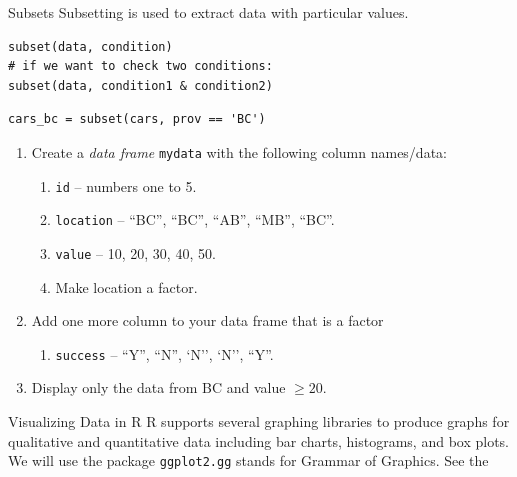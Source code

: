 \documentclass[xcolor=svgnames, 10pt, handout]{beamer}
\begin{document}
\begin{frame}[fragile]{Subsets}
Subsetting is used to extract data with particular values.
\vfill
\begin{Verbatim}[xleftmargin=2em, xrightmargin=1.5em, frame=single, label=Syntax in R, framesep=0.5em]
subset(data, condition)
# if we want to check two conditions:
subset(data, condition1 & condition2)
\end{Verbatim}
\vfill
\begin{Verbatim}[xleftmargin=2em, xrightmargin=1.5em, frame=single, label=Example in R, framesep=0.5em]
cars_bc = subset(cars, prov == 'BC')
\end{Verbatim}
\vfill
\end{frame}


\begin{frame}[fragile]
\begin{question}
\begin{enumerate}
\item Create a \emph{data frame} \verb|mydata| with the following column names/data:
\begin{enumerate}
\item \verb|id| -- numbers one to 5.
\item \verb|location| -- ``BC'', ``BC'', ``AB'', ``MB'', ``BC''.
\item \verb|value| -- 10, 20, 30, 40, 50.
\item Make location a factor.
\end{enumerate}
\item Add one more column to your data frame that is a factor
\begin{enumerate}
\item \verb|success| -- ``Y'', ``N'', `N'', `N'', ``Y''.
\end{enumerate}
\item Display only the data from BC and value $\geq 20$.
\end{enumerate}
\end{question}

\end{frame}


\begin{frame}[fragile]{Visualizing Data in R}
R supports several graphing libraries to produce graphs for qualitative and quantitative data including bar charts, histograms, and box plots.
\vfill
We will use the package \verb|ggplot2.gg| stands for Grammar of Graphics.
\vfill
See the \href{https://www.rstudio.com/wp-content/uploads/2015/03/ggplot2-cheatsheet.pdf}{}
\end{frame}
\end{document}
